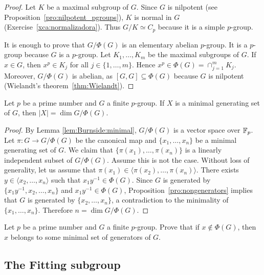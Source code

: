 \begin{proof}
Let $K$ be a maximal subgroup of $G$. Since $G$ is nilpotent 
(see Proposition~\ref{pro:nilpotent_pgroups}), 
$K$ is normal in $G$ (Exercise~\ref{xca:normalizadora}). 
Thus $G/K\simeq C_p$ because it is a simple $p$-group. 
	
It is enough to prove that $G/\Phi(G)$ is an elementary abelian $p$-group. It is a 
$p$-group because $G$ is a $p$-group. Let $K_1,\dots,K_m$ be the maximal subgroups 
of $G$. If $x\in G$, then $x^p\in K_j$ for all $j\in\{1,\dots,m\}$. Hence 
$x^p\in\Phi(G)=\cap_{j=1}^m K_j$. Moreover,  $G/\Phi(G)$ is abelian, as 
$[G,G]\subseteq \Phi(G)$ because $G$ is nilpotent (Wielandt's theorem~\ref{thm:Wielandt}). 
\end{proof}

\begin{theorem}[Burnside]
\label{thm:Burnside:basis}
Let $p$ be a prime number and $G$ a finite $p$-group. If $X$ is a minimal 
generating set of $G$, then $|X|=\dim G/\Phi(G)$. 
\end{theorem}

\begin{proof}
By Lemma \ref{lem:Burnside:minimal}, $G/\Phi(G)$ is a vector space over $\mathbb{F}_p$. 
Let $\pi\colon G\to G/\Phi(G)$ be the canonical map and 
$\{x_1,\dots,x_n\}$ be a minimal generating set of $G$.
We claim that $\{\pi(x_1),\dots,\pi(x_n)\}$ is a linearly independent subset of $G/\Phi(G)$. 
Assume this is not the case. Without loss of generality, let us assume that 
$\pi(x_1)\in\langle \pi(x_2),\dots,\pi(x_n)\rangle$. There exists $y\in
\langle x_2,\dots,x_n\rangle$ such that $x_1y^{-1}\in\Phi(G)$. Since $G$ is generated by 
$\{x_1y^{-1},x_2,\dots,x_n\}$ and $x_1y^{-1}\in\Phi(G)$, Proposition~\ref{pro:nongenerators}
implies that $G$ is generated by 
$\{x_2,\dots,x_n\}$, a contradiction to the minimality of $\{x_1,\dots,x_n\}$. 
Therefore $n=\dim G/\Phi(G)$.
\end{proof}


\begin{exercise}
Let $p$ be a prime number and $G$ a finite $p$-group. Prove that if $x\not\in\Phi(G)$, then 
$x$ belongs to some minimal set of generators of $G$. 
\end{exercise}


\subsection{The Fitting subgroup}


